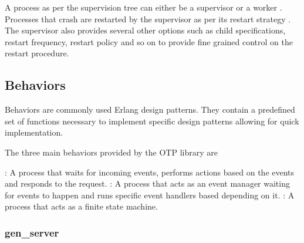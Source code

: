 A process as per the supervision tree can either be a supervisor%
or a worker%
. Processes that crash are restarted by the supervisor as per its
restart strategy%
. The supervisor also provides several other options such as child
specifications, restart frequency, restart policy and so on to provide
fine grained control on the restart procedure.

\subsection{Behaviors}
\label{section:concepts.behaviours}
Behaviors are commonly used Erlang design patterns. They contain a predefined
set of functions necessary to implement specific design patterns allowing for
quick implementation.

The three main behaviors provided by the OTP library are

\begin{itemize}
    : A process that waits for incoming events, performs
    actions based on the events and responds to the request.
    : A process that acts as an event manager waiting for
    events to happen and runs specific event handlers based depending on it.
    : A process that acts as a finite state machine.
\end{itemize}

\subsubsection{gen\_server}
\label{section:gen.server}

